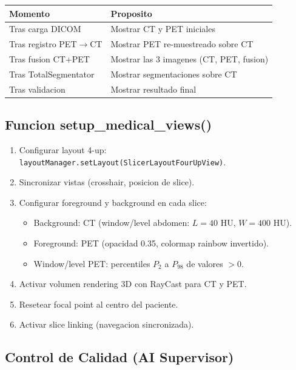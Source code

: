 \documentclass[12pt,a4paper]{article}
\begin{document}
\begin{table}[H]
\centering
\begin{tabular}{l l}
\toprule
\textbf{Momento} & \textbf{Proposito} \\
\midrule
Tras carga DICOM & Mostrar CT y PET iniciales \\
Tras registro PET$\to$CT & Mostrar PET re-muestreado sobre CT \\
Tras fusion CT+PET & Mostrar las 3 imagenes (CT, PET, fusion) \\
Tras TotalSegmentator & Mostrar segmentaciones sobre CT \\
Tras validacion & Mostrar resultado final \\
\bottomrule
\end{tabular}
\end{table}

\subsection{Funcion setup\_medical\_views()}

\begin{enumerate}
    \item Configurar layout 4-up:
          \texttt{layoutManager.setLayout(SlicerLayoutFourUpView)}.
    \item Sincronizar vistas (crosshair, posicion de slice).
    \item Configurar foreground y background en cada slice:
          \begin{itemize}
              \item Background: CT (window/level abdomen: $L=40$ HU, $W=400$ HU).
              \item Foreground: PET (opacidad 0.35, colormap rainbow invertido).
              \item Window/level PET: percentiles $P_2$ a $P_{98}$ de valores $>0$.
          \end{itemize}
    \item Activar volumen rendering 3D con RayCast para CT y PET.
    \item Resetear focal point al centro del paciente.
    \item Activar slice linking (navegacion sincronizada).
\end{enumerate}

\subsection{Control de Calidad (AI Supervisor)}
\end{document}
